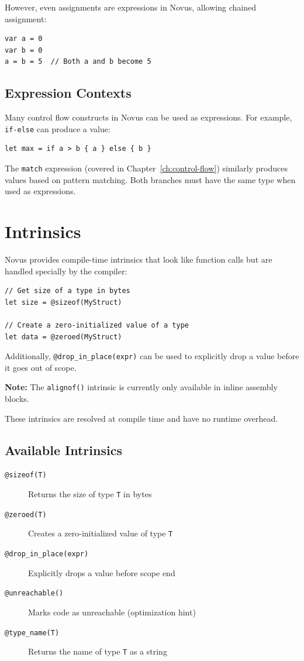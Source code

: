 However, even assignments are expressions in Novus, allowing chained assignment:

\begin{lstlisting}
var a = 0
var b = 0
a = b = 5  // Both a and b become 5
\end{lstlisting}

\subsection{Expression Contexts}

Many control flow constructs in Novus can be used as expressions. For example, \texttt{if-else} can produce a value:

\begin{lstlisting}
let max = if a > b { a } else { b }
\end{lstlisting}

The \texttt{match} expression (covered in Chapter~\ref{ch:control-flow}) similarly produces values based on pattern matching. Both branches must have the same type when used as expressions.

\section{Intrinsics}

Novus provides compile-time intrinsics that look like function calls but are handled specially by the compiler:

\begin{lstlisting}
// Get size of a type in bytes
let size = @sizeof(MyStruct)

// Create a zero-initialized value of a type
let data = @zeroed(MyStruct)
\end{lstlisting}

Additionally, \texttt{@drop\_in\_place(expr)} can be used to explicitly drop a value before it goes out of scope.

\textbf{Note:} The \texttt{alignof()} intrinsic is currently only available in inline assembly blocks.

These intrinsics are resolved at compile time and have no runtime overhead.

\subsection{Available Intrinsics}

\begin{description}
    \item[\texttt{@sizeof(T)}] Returns the size of type \texttt{T} in bytes
    \item[\texttt{@zeroed(T)}] Creates a zero-initialized value of type \texttt{T}
    \item[\texttt{@drop\_in\_place(expr)}] Explicitly drops a value before scope end
    \item[\texttt{@unreachable()}] Marks code as unreachable (optimization hint)
    \item[\texttt{@type\_name(T)}] Returns the name of type \texttt{T} as a string
\end{description}


